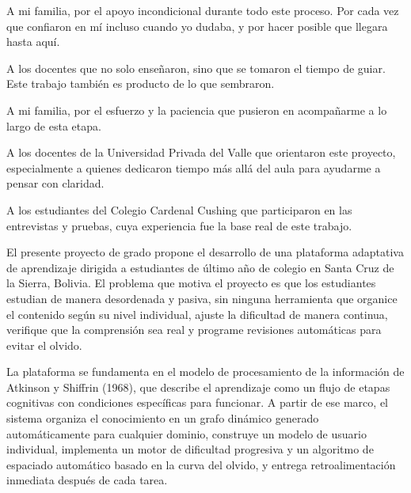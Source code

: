 

A mi familia, por el apoyo incondicional durante todo este proceso. Por cada vez que confiaron en mí incluso cuando yo dudaba, y por hacer posible que llegara hasta aquí.

A los docentes que no solo enseñaron, sino que se tomaron el tiempo de guiar. Este trabajo también es producto de lo que sembraron.


A mi familia, por el esfuerzo y la paciencia que pusieron en acompañarme a lo largo de esta etapa.

A los docentes de la Universidad Privada del Valle que orientaron este proyecto, especialmente a quienes dedicaron tiempo más allá del aula para ayudarme a pensar con claridad.

A los estudiantes del Colegio Cardenal Cushing que participaron en las entrevistas y pruebas, cuya experiencia fue la base real de este trabajo.


El presente proyecto de grado propone el desarrollo de una plataforma adaptativa de aprendizaje dirigida a estudiantes de último año de colegio en Santa Cruz de la Sierra, Bolivia. El problema que motiva el proyecto es que los estudiantes estudian de manera desordenada y pasiva, sin ninguna herramienta que organice el contenido según su nivel individual, ajuste la dificultad de manera continua, verifique que la comprensión sea real y programe revisiones automáticas para evitar el olvido.

La plataforma se fundamenta en el modelo de procesamiento de la información de Atkinson y Shiffrin (1968), que describe el aprendizaje como un flujo de etapas cognitivas con condiciones específicas para funcionar. A partir de ese marco, el sistema organiza el conocimiento en un grafo dinámico generado automáticamente para cualquier dominio, construye un modelo de usuario individual, implementa un motor de dificultad progresiva y un algoritmo de espaciado automático basado en la curva del olvido, y entrega retroalimentación inmediata después de cada tarea.

